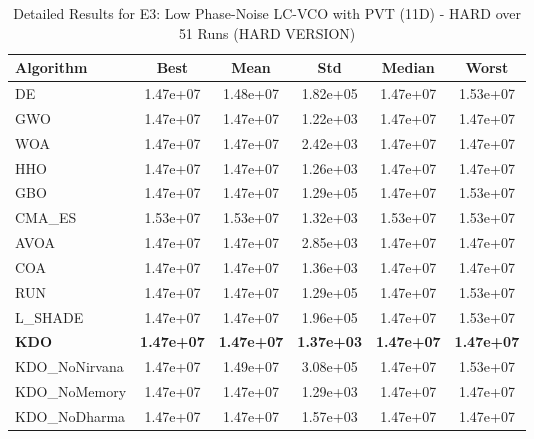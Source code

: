 \begin{table}[htbp]
\centering
\caption{Detailed Results for E3: Low Phase-Noise LC-VCO with PVT (11D) - HARD over 51 Runs (HARD VERSION)}
\label{tab:P3_detailed}
\small
\begin{tabular}{lccccc}
\toprule
\textbf{Algorithm} & \textbf{Best} & \textbf{Mean} & \textbf{Std} & \textbf{Median} & \textbf{Worst} \\
\midrule
DE & 1.47e+07 & 1.48e+07 & 1.82e+05 & 1.47e+07 & 1.53e+07 \\
GWO & 1.47e+07 & 1.47e+07 & 1.22e+03 & 1.47e+07 & 1.47e+07 \\
WOA & 1.47e+07 & 1.47e+07 & 2.42e+03 & 1.47e+07 & 1.47e+07 \\
HHO & 1.47e+07 & 1.47e+07 & 1.26e+03 & 1.47e+07 & 1.47e+07 \\
GBO & 1.47e+07 & 1.47e+07 & 1.29e+05 & 1.47e+07 & 1.53e+07 \\
CMA_ES & 1.53e+07 & 1.53e+07 & 1.32e+03 & 1.53e+07 & 1.53e+07 \\
AVOA & 1.47e+07 & 1.47e+07 & 2.85e+03 & 1.47e+07 & 1.47e+07 \\
COA & 1.47e+07 & 1.47e+07 & 1.36e+03 & 1.47e+07 & 1.47e+07 \\
RUN & 1.47e+07 & 1.47e+07 & 1.29e+05 & 1.47e+07 & 1.53e+07 \\
L_SHADE & 1.47e+07 & 1.47e+07 & 1.96e+05 & 1.47e+07 & 1.53e+07 \\
\textbf{KDO} & \textbf{1.47e+07} & \textbf{1.47e+07} & \textbf{1.37e+03} & \textbf{1.47e+07} & \textbf{1.47e+07} \\
KDO_NoNirvana & 1.47e+07 & 1.49e+07 & 3.08e+05 & 1.47e+07 & 1.53e+07 \\
KDO_NoMemory & 1.47e+07 & 1.47e+07 & 1.29e+03 & 1.47e+07 & 1.47e+07 \\
KDO_NoDharma & 1.47e+07 & 1.47e+07 & 1.57e+03 & 1.47e+07 & 1.47e+07 \\
\bottomrule
\end{tabular}
\end{table}
